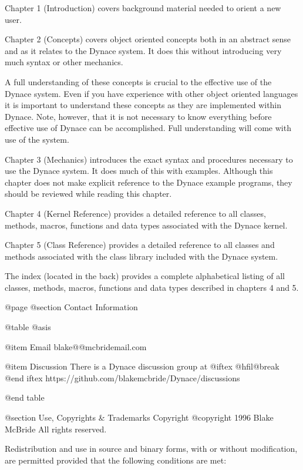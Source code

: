 Chapter 1 (Introduction) covers background material needed to orient
a new user.

Chapter 2 (Concepts) covers object oriented concepts both in an abstract
sense and as it relates to the Dynace system.  It does this without
introducing very much syntax or other mechanics.

A full understanding of these concepts is crucial to the effective use
of the Dynace system.  Even if you have experience with other object
oriented languages it is important to understand these concepts as they
are implemented within Dynace.  Note, however, that it is not necessary to
know everything before effective use of Dynace can be accomplished.  Full
understanding will come with use of the system.

Chapter 3 (Mechanics) introduces the exact syntax and procedures
necessary to use the Dynace system.  It does much of this with examples.
Although this chapter does not make explicit reference to the Dynace example
programs, they should be reviewed while reading this chapter.

Chapter 4 (Kernel Reference) provides a detailed reference to all
classes, methods, macros, functions and data types associated with
the Dynace kernel.

Chapter 5 (Class Reference)  provides a detailed reference to all
classes and methods associated with the class library included
with the Dynace system.

The index (located in the back) provides a complete alphabetical
listing of all classes, methods, macros, functions and data types
described in chapters 4 and 5.






@page
@section Contact Information

@table @asis

@item Email
blake@@mcbridemail.com

@item Discussion
There is a Dynace discussion group at 
@iftex
@hfil@break
@end iftex
https://github.com/blakemcbride/Dynace/discussions

@end table




@section Use, Copyrights & Trademarks
Copyright  @copyright{} 1996 Blake McBride
All rights reserved.

Redistribution and use in source and binary forms, with or without
modification, are permitted provided that the following conditions are
met:

